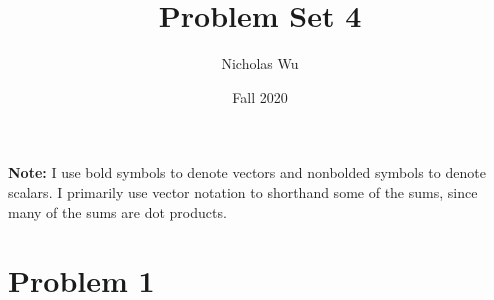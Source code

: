 \documentclass[10pt,letter]{article}
\newcommand{\problem}[1]{\section*{Problem #1}}
\begin{document}


\title{Problem Set 4}

\author{Nicholas Wu}

\date{Fall 2020}

\maketitle
\textbf{Note:} I use bold symbols to denote vectors and nonbolded symbols to denote scalars. I primarily use vector notation to shorthand some of the sums, since many of the sums are dot products.

\problem{1}
\end{document}
